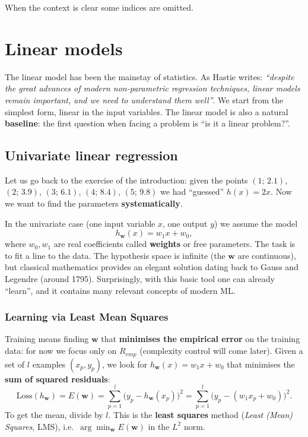 When the context is clear some indices are omitted.

\section{Linear models}\label{modelli-lineari}

The linear model has been the mainstay of statistics. As Hastie writes:
\emph{``despite the great advances of modern non-parametric regression
techniques, linear models remain important, and we need to understand
them well''}. We start from the simplest form, linear in the input
variables. The linear model is also a natural \textbf{baseline}: the
first question when facing a problem is ``is it a linear problem?''.

\subsection{Univariate linear
regression}\label{regressione-lineare-univariata}

Let us go back to the exercise of the introduction: given the points
\((1;\,2.1)\), \((2;\,3.9)\), \((3;\,6.1)\), \((4;\,8.4)\),
\((5;\,9.8)\) we had ``guessed'' \(h(x) = 2x\). Now we want to find
the parameters \textbf{systematically}.

In the univariate case (one input variable \(x\), one output \(y\)) we
assume the model \[
h_\mathbf{w}(x) = w_1 x + w_0,
\] where \(w_0, w_1\) are real coefficients called \textbf{weights} or
free parameters. The task is to fit a line to the data. The hypothesis
space is infinite (the \(\mathbf{w}\) are continuous), but classical
mathematics provides an elegant solution dating back to Gauss and
Legendre (around 1795). Surprisingly, with this basic tool one can
already ``learn'', and it contains many relevant concepts of modern ML.

\subsubsection{Learning via Least Mean
Squares}\label{apprendimento-tramite-least-mean-squares}

Training means finding \(\mathbf{w}\) that \textbf{minimises the
empirical error} on the training data: for now we focus only on
\(R_{emp}\) (complexity control will come later). Given a set of \(l\)
examples \((x_p, y_p)\), we look for \(h_\mathbf{w}(x) = w_1 x + w_0\)
that minimises the \textbf{sum of squared residuals}: \[
\text{Loss}(h_\mathbf{w}) = E(\mathbf{w}) = \sum_{p=1}^{l} \big(y_p - h_\mathbf{w}(x_p)\big)^2 = \sum_{p=1}^{l} \big(y_p - (w_1 x_p + w_0)\big)^2.
\] To get the mean, divide by \(l\). This is the \textbf{least
squares} method (\emph{Least (Mean) Squares}, LMS), i.e.\
\(\arg\min_\mathbf{w} E(\mathbf{w})\) in the \(L^2\) norm.

